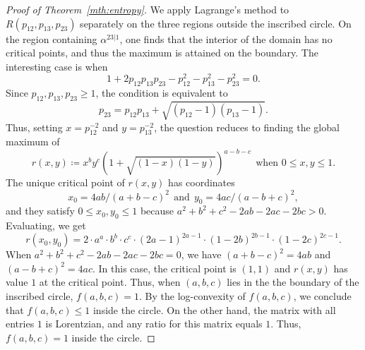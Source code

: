 \documentclass{amsart}
\theoremstyle{definition}
\theoremstyle{remark}
\begin{document}
\begin{proof}[Proof of Theorem~\ref{mth:entropy}]
We apply Lagrange's method to $R(p_{12},p_{13},p_{23})$ separately on the three regions outside the inscribed circle. On the region containing $\alpha^{23|1}$,  one finds that the interior of the domain has no critical points, and thus the maximum is attained on the boundary. 
The interesting case is when 
\[
1+2p_{12}p_{13}p_{23}-p^2_{12}-p^2_{13}-p^2_{23}=0.
\]
Since $p_{12},p_{13},p_{23} \ge 1$, the condition is equivalent to 
\[
p_{23}=p_{12}p_{13}+\sqrt{(p_{12}-1)(p_{13}-1)}.
\]
Thus, setting $x=p^{-2}_{12}$ and $y=p^{-2}_{13}$, the question reduces to finding the global maximum of 
\[
r(x,y) \coloneq x^{b}y^{c}\left(1+\sqrt{(1-x)(1-y)}\right)^{a-b-c} \ \ \text{when $0\leq x,y \leq 1$}.
\]
The unique critical point of $r(x,y)$ has coordinates 
\[
x_0=4ab/(a+b-c)^2  \ \ \text{and} \ \  y_0=4ac/(a-b+c)^2,
\]
and they satisfy $0 \le x_0, y_0 \le 1$ because $a^2+b^2+c^2-2ab-2ac-2bc >0$. Evaluating, we get
\[
r(x_0,y_0)=2\cdot a^a\cdot b^b \cdot c^c \cdot (2a-1)^{2a-1} \cdot (1-2b)^{2b-1}\cdot (1-2c)^{2c-1}.
\]
When $a^2+b^2+c^2-2ab-2ac-2bc=0$, we have $(a+b-c)^2=4ab$ and $(a-b+c)^2=4ac$. In this case, the critical point is $(1,1)$ and $r(x,y)$ has value $1$ at the critical point. 
Thus, when $(a,b,c)$ lies in the the boundary of the inscribed circle, $f(a,b,c)=1$. By the log-convexity of $f(a,b,c)$, 
 we conclude that $f(a,b,c)\leq 1$ inside the circle. On the other hand, the matrix with all entries $1$ is Lorentzian, and any ratio for this matrix equals $1$. Thus, $f(a,b,c)=1$ inside the circle.
\end{proof}
\end{document}
